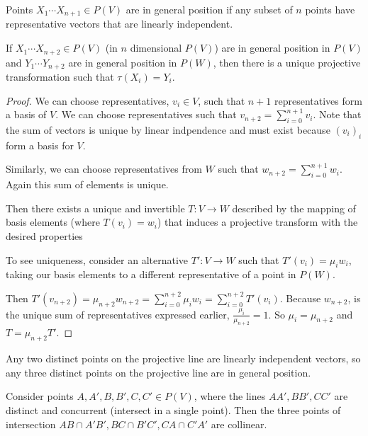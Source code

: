 \documentclass[10pt]{article}
\begin{document}
\begin{definition}
	 Points $X_1 \cdots X_{n+1} \in P(V)$ are in general position if any subset
	 of $n$ points have representative vectors that are linearly independent.
\end{definition}

\begin{theorem}
	 If $X_1 \cdots X_{n+2} \in P(V)$ (in $n$ dimensional $P(V)$) are in general
	 position in $P(V)$ and $Y_1 \cdots Y_{n+2}$ are in general position in
	 $P(W)$, then there is a unique projective transformation such that
	 $\tau(X_i) = Y_i$.
\end{theorem}

\begin{proof}

	We can choose representatives, $v_i \in V$, such that $n+1$ representatives
	form a basis of $V$. We can choose representatives such that
	$v_{n+2} = \sum_{i=0}^{n+1} v_i$. Note that the sum of vectors is unique by
	linear indpendence and must exist because $( v_i )_i$ form a basis for $V$.

	Similarly, we can choose representatives from $W$ such that $w_{n+2} =
	\sum_{i=0}^{n+1} w_i$. Again this sum of elements is unique.

	Then there exists a unique and invertible $T: V \to W$ described by the mapping of basis
	elements (where $T(v_i) = w_i$) that induces a projective transform with the
	desired properties

	To see uniqueness, consider an alternative $T': V \to W$ such that $T'(v_i) =
	\mu_i w_i$, taking our basis elements to a different representative of a point in $P(W)$.

	Then $T'(v_{n+2}) = \mu_{n+2} w_{n+2} = \sum_{i=0}^{n+2} \mu_i w_i =
	\sum_{i=0}^{n+2} T'(v_i)$. Because $w_{n+2}$, is the unique sum of
	representatives expressed earlier, $\frac{\mu_i}{\mu_{n+2}} = 1$. So $\mu_i =
	\mu_{n+2}$ and $T = \mu_{n+2}T'$.

\end{proof}

\begin{note}
Any two distinct points on the projective line are linearly independent
vectors, so any three distinct points on the projective line are in general
position.
\end{note}

\begin{theorem}
	Consider points $A, A', B, B', C, C' \in P(V)$, where the lines $AA', BB',
	CC'$ are distinct and concurrent (intersect in a single point). Then the
	three points of intersection $AB \cap A'B', BC \cap B'C', CA \cap C'A'$ are
	collinear.
\end{theorem}
\end{document}
